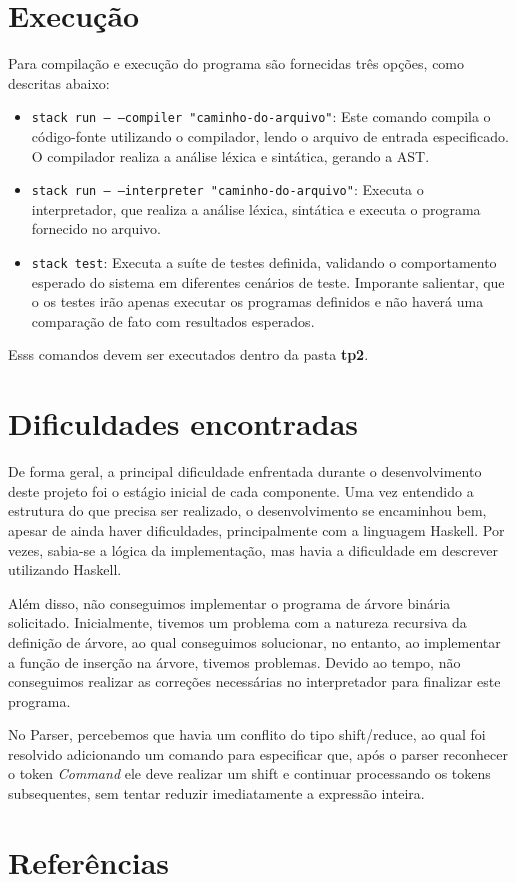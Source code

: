 \documentclass{article}
\begin{document}
\section{Execução}
Para compilação e execução do programa são fornecidas três opções, como descritas abaixo:

\begin{itemize}
    \item \texttt{stack run -- --compiler "caminho-do-arquivo"}: Este comando compila o código-fonte utilizando o compilador, lendo o arquivo de entrada especificado. O compilador realiza a análise léxica e sintática, gerando a AST.
    \item \texttt{stack run -- --interpreter "caminho-do-arquivo"}: Executa o interpretador, que realiza a análise léxica, sintática e executa o programa fornecido no arquivo.
    \item \texttt{stack test}: Executa a suíte de testes definida, validando o comportamento esperado do sistema em diferentes cenários de teste. Imporante salientar, que o os testes irão apenas executar os programas definidos e não haverá uma comparação de fato com resultados esperados.
\end{itemize}

Esss comandos devem ser executados dentro da pasta \textbf{tp2}.

\section{Dificuldades encontradas}
De forma geral, a principal dificuldade enfrentada durante o desenvolvimento deste projeto foi o estágio inicial de cada componente. Uma vez entendido a estrutura do que precisa ser realizado, o desenvolvimento se encaminhou bem, apesar de ainda haver dificuldades, principalmente com a linguagem Haskell. Por vezes, sabia-se a lógica da implementação, mas havia a dificuldade em descrever utilizando Haskell.

Além disso, não conseguimos implementar o programa de árvore binária solicitado. Inicialmente, tivemos um problema com a natureza recursiva da definição de árvore, ao qual conseguimos solucionar, no entanto, ao implementar a função de inserção na árvore, tivemos problemas. Devido ao tempo, não conseguimos realizar as correções necessárias no interpretador para finalizar este programa.

No Parser, percebemos que havia um conflito do tipo shift/reduce, ao qual foi resolvido adicionando um comando para especificar que, após o parser reconhecer o token \textit{Command} ele deve realizar um shift e continuar processando os tokens subsequentes, sem tentar reduzir imediatamente a expressão inteira.

\section{Referências}

\printbibliography

\newpage
\end{document}
